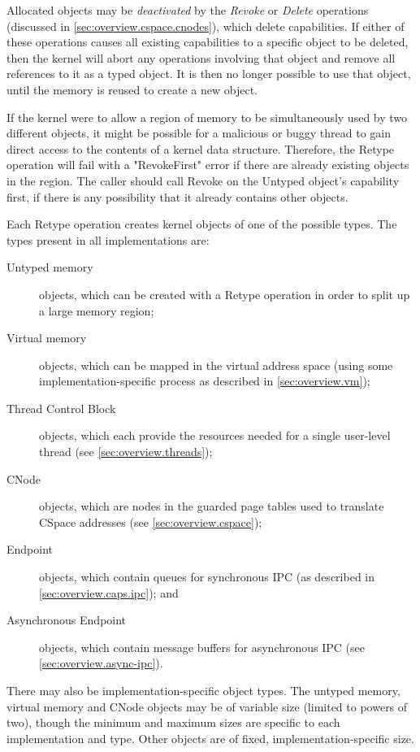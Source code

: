 Allocated objects may be \emph{deactivated} by the \emph{Revoke} or
\emph{Delete} operations (discussed in \autoref{sec:overview.cspace.cnodes}),
which delete capabilities. If either of these operations causes all existing
capabilities to a specific object to be deleted, then the kernel will abort any
operations involving that object and remove all references to it as a typed
object. It is then no longer possible to use that object, until the memory is
reused to create a new object.

If the kernel were to allow a region of memory to be simultaneously used by two
different objects, it might be possible for a malicious or buggy thread to gain
direct access to the contents of a kernel data structure. Therefore, the
Retype operation will fail with a "RevokeFirst" error if there are already
existing objects in the region. The caller should call Revoke on the Untyped
object's capability first, if there is any possibility that it already contains
other objects.

Each Retype operation creates kernel objects of one of the possible types. The
types present in all implementations are:

\begin{description}
\item [Untyped memory] objects, which can be created with a Retype operation
in order to split up a large memory region;
\item [Virtual memory] objects, which can be mapped in the virtual address
space (using some implementation-specific process as described in
\autoref{sec:overview.vm});
\item [Thread Control Block] objects, which each provide the resources needed
for a single user-level thread (see \autoref{sec:overview.threads});
\item [CNode] objects, which are nodes in the guarded page tables used to
translate CSpace addresses (see \autoref{sec:overview.cspace});
\item [Endpoint] objects, which contain queues for synchronous IPC (as
described in \autoref{sec:overview.caps.ipc}); and
\item [Asynchronous Endpoint] objects, which contain message buffers for
asynchronous IPC (see \autoref{sec:overview.async-ipc}).
\end{description}

There may also be implementation-specific object types. The untyped
memory, virtual memory and CNode objects may be of variable size (limited to
powers of two), though the minimum and maximum sizes are specific to each
implementation and type. Other objects are of fixed, implementation-specific
size.

